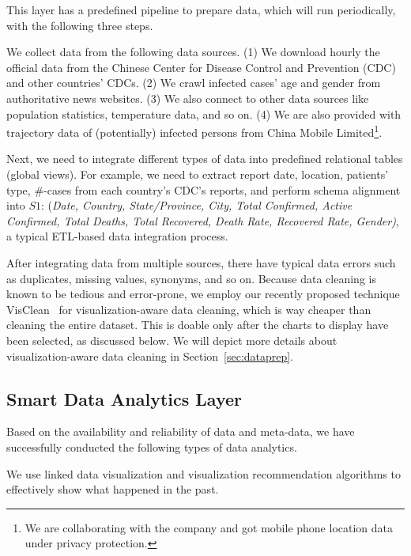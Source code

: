 This layer has a predefined pipeline to prepare data, which will run periodically, with the following three steps.

We collect data from the following data sources.
(1) We download hourly the official data from the Chinese Center for Disease Control and Prevention (CDC) and other countries' CDCs.
(2) We crawl infected cases' age and gender from authoritative news websites.
(3) We also connect to other data sources like population statistics, temperature data, and so on. 
(4) We are also provided with trajectory data of (potentially) infected persons from China Mobile Limited\footnote{We are collaborating with the company and got mobile phone location data under privacy protection.}. 

 Next, we need to integrate different types of data into predefined relational tables (\ie global views).
For example, we need to extract report date, location, patients' type, \#-cases from each country's CDC's reports, and  perform schema alignment into  $S1$: ({\em Date, Country, State/Province, City, Total Confirmed, Active Confirmed, Total Deaths, Total Recovered, Death Rate, Recovered Rate, Gender)}, a typical ETL-based data integration process. 


 After integrating data from multiple sources, there have typical data errors such as duplicates, missing values, synonyms, and so on. 
Because data cleaning is known to be tedious and error-prone, we employ our recently proposed technique {\sc VisClean}~\cite{visclean-icde} for visualization-aware data cleaning, which is way cheaper than cleaning the entire dataset. This is doable only after the charts to display have been selected, as discussed below. 
We will depict more details about visualization-aware data cleaning in Section~\ref{sec:dataprep}.

\subsection{Smart Data Analytics Layer}
\label{subsec:vs}
Based on the availability and reliability of data and meta-data, we have successfully conducted the following types of data analytics.

We use linked data visualization and visualization recommendation algorithms to effectively show what happened in the past.


